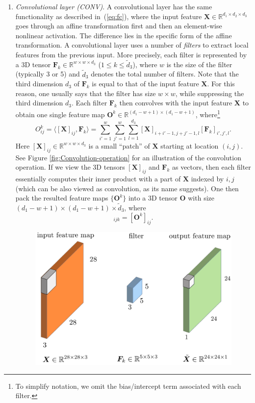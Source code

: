 \begin{enumerate}


\item \emph{Convolutional layer (CONV)}. A convolutional layer has the same functionality as described in~(\ref{eq:fc}), where the input feature $\bm{X}\in\mathbb{R}^{d_1 \times d_2 \times d_3}$ goes through an affine transformation first and then an element-wise nonlinear activation. The difference lies in the specific form of the affine transformation. A convolutional layer uses a number of \emph{filters} to extract local features from the previous input. More precisely, each filter is represented by a 3D tensor $\bm{F}_{k}\in\mathbb{R}^{w\times w\times d_{3}}$ ($1\leq k\leq \tilde d_3$), where $w$ is the size of the filter (typically 3 or 5) and $\tilde d_3$ denotes the total number of filters. Note that the third dimension $d_3$ of $\bm{F}_{k}$ is equal to that of the input feature $\bm{X}$. For this reason, one usually says that the filter has size $w \times w$, while suppressing the third dimension $d_3$. Each filter $\bm{F}_{k}$ then convolves with the input feature $\bm{X}$ to obtain one single feature map $\bm{O}^{k} \in \mathbb{R}^{(d_1 - w +1) \times (d_1 - w +1)} $, where\footnote{To simplify notation, we omit the bias/intercept term associated with each filter.}
\begin{equation}\label{eq:conv}
O^{k}_{ij}= \big\langle \left[\bm{X}\right]_{ij}, \bm{F}_{k} \big\rangle = \sum_{i'=1}^w \sum_{j'=1}^w \sum_{l=1}^{d_3} [\bm{X}]_{i+i'-1, j+j'-1, l} [\bm{F}_{k}]_{i',j',l}.
\end{equation}
Here $[\bm{X}]_{ij}\in\mathbb{R}^{w\times w\times d_{3}}$ is a small ``patch'' of $\bm{X}$ starting at location $(i,j)$. See Figure \ref{fig:Convolution-operation}
for an illustration of the convolution operation. If we view the 3D tensors $[\bm{X}]_{ij}$ and $\bm{F}_{k}$ as vectors, then each filter essentially computes their inner product with a part of $\bm{X}$ indexed by $i,j$ (which can be also viewed as convolution, as its name suggests). One then pack the resulted feature maps $\{\bm{O}^{k}\}$ into a 3D tensor $\bm{O}$ with size $(d_1 - w +1) \times (d_1 - w +1) \times \tilde d_3$, where
\begin{equation}
[\bm{O}]_{ijk} = [\bm{O}^{k}]_{ij}.
\end{equation}
\begin{figure}
\centering

\includegraphics[height=0.4\textwidth]{convolution_3D}


\end{figure}
\end{enumerate}
